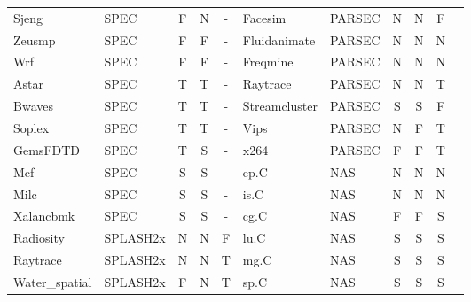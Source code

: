 \begin{landscape}
\begin{table}[htb]
{\begin{tabular}{@{}ll ccc  
                       ll ccc c@{}}
        Sjeng       & SPEC    & F       & N     & -  & Facesim     & PARSEC  & N       & N     & F \\
        Zeusmp      & SPEC    & F       & F     & -  & Fluidanimate& PARSEC  & N       & N     & N \\
        Wrf         & SPEC    & F       & F     & -  & Freqmine    & PARSEC  & N       & N     & N \\                                                  
        Astar       & SPEC    & T       & T     & -  & Raytrace    & PARSEC  & N       & N     & T \\
        Bwaves      & SPEC    & T       & T     & -  & Streamcluster& PARSEC  & S       & S     & F \\
        Soplex      & SPEC    & T       & T     & -  & Vips        & PARSEC  & N       & F     & T \\
        GemsFDTD    & SPEC    & T       & S     & -  & x264        & PARSEC  & F       & F     & T \\
        Mcf         & SPEC    & S       & S     & -  & ep.C        & NAS     & N       & N     & N \\
        Milc        & SPEC    & S       & S     & -  & is.C        & NAS     & N       & N     & N \\
        Xalancbmk   & SPEC    & S       & S     & -  & cg.C        & NAS     & F       & F     & S \\
        Radiosity   & SPLASH2x& N       & N     & F  & lu.C        & NAS     & S       & S     & S \\  
        Raytrace    & SPLASH2x& N       & N     & T  & mg.C        & NAS     & S       & S     & S \\  
        Water\_spatial& SPLASH2x& F       & N     & T& sp.C        & NAS     & S       & S     & S \\  

        \bottomrule
        \end{tabular}
    }
    \label{tab: classes}
\end{table}

\end{landscape} 
\fi



